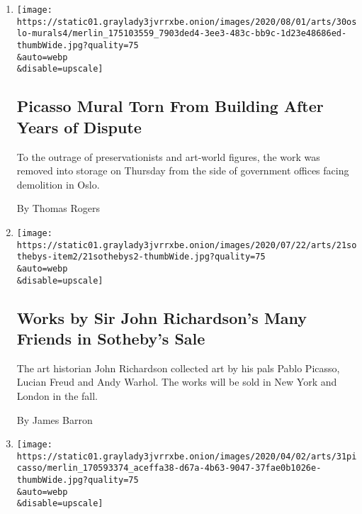 \begin{enumerate}
\def\labelenumi{\arabic{enumi}.}
\item
  \href{/2020/07/30/arts/design/picasso-fishermen-mural-norway.html}{}

  \texttt{[image: https://static01.graylady3jvrrxbe.onion/images/2020/08/01/arts/30oslo-murals4/merlin\_175103559\_7903ded4-3ee3-483c-bb9c-1d23e48686ed-thumbWide.jpg?quality=75\\\&auto=webp\\\&disable=upscale]}

  \hypertarget{picasso-mural-torn-from-building-after-years-of-dispute}{%
  \subsection{Picasso Mural Torn From Building After Years of
  Dispute}\label{picasso-mural-torn-from-building-after-years-of-dispute}}

  To the outrage of preservationists and art-world figures, the work was
  removed into storage on Thursday from the side of government offices
  facing demolition in Oslo.

  By Thomas Rogers
\item
  \href{/2020/07/21/arts/design/sothebys-john-richardson-freud.html}{}

  \texttt{[image: https://static01.graylady3jvrrxbe.onion/images/2020/07/22/arts/21sothebys-item2/21sothebys2-thumbWide.jpg?quality=75\\\&auto=webp\\\&disable=upscale]}

  \hypertarget{works-by-sir-john-richardsons-many-friends-in-sothebys-sale}{%
  \subsection{Works by Sir John Richardson's Many Friends in Sotheby's
  Sale}\label{works-by-sir-john-richardsons-many-friends-in-sothebys-sale}}

  The art historian John Richardson collected art by his pals Pablo
  Picasso, Lucian Freud and Andy Warhol. The works will be sold in New
  York and London in the fall.

  By James Barron
\item
  \href{/2020/03/31/arts/design/picasso-national-gallery-of-art-heirs.html}{}

  \texttt{[image: https://static01.graylady3jvrrxbe.onion/images/2020/04/02/arts/31picasso/merlin\_170593374\_aceffa38-d67a-4b63-9047-37fae0b1026e-thumbWide.jpg?quality=75\\\&auto=webp\\\&disable=upscale]}

  \hypertarget{national-gallery-of-art-returns-picasso-work-to-settle-claim}{%
}
\end{enumerate}
